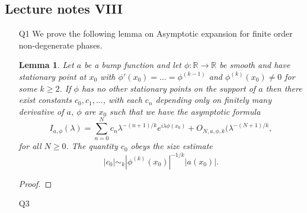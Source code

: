 \documentclass[11pt]{article}
\newtheorem{lem}[thm]{Lemma}
\theoremstyle{remark}
\newcommand{\1}{\textbf{1}}
\newcommand{\bbR}{\mathbb{R}}
\begin{document}
\subsection*{Lecture notes VIII}
\begin{enumerate}
\item[Q1] We prove the following lemma on Asymptotic expansion for finite order non-degenerate phases.
\begin{lem}
Let $a$ be a bump function and let $\phi:\bbR \to \bbR$ be smooth and have stationary point at $x_0$ with $\phi'(x_0) = \ldots = \phi^{(k-1)}$ and $\phi^{(k)}(x_0) \neq 0$ for some $k \geq 2$. If $\phi$ has no other stationary points on the support of $a$ then there exist constants $c_0, c_1, \ldots$, with each $c_n$ depending only on finitely many derivative of $a$, $\phi$ are $x_0$ such that we have the asymptotic formula
\[
I_{a, \phi}(\lambda) = \sum_{n=0}^N c_n \lambda^{-(n+1)/k} e^{i \lambda \phi(x_0)} + O_{N,a, \phi,k}(\lambda^{-(N+1)/k},
\]
for all $N \geq 0$. The quantity $c_0$ obeys the size estimate
\[
|c_0| \sim_k |\phi^{(k)}(x_0)|^{-1/k}|a(x_0)|.
\]
\end{lem}
\begin{proof}

\end{proof}
\item[Q3]
\end{enumerate}
\end{document}
